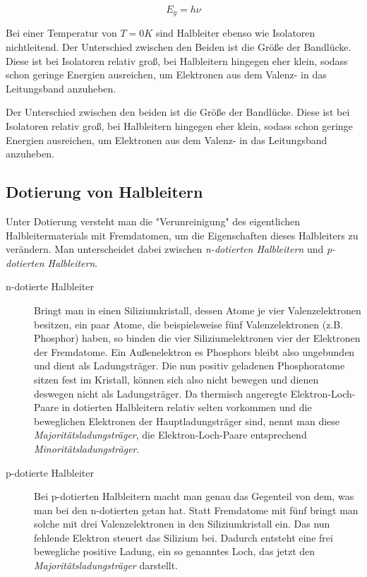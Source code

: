 \documentclass[slug=SZ, room=Hermann-Krone-Bau\,\ Labor\ 1.25, supervisor=Martin\ Kroll]{../../Lab_Report_LaTeX/lab_report}
\begin{document}
\begin{equation}\label{eq:bandenenergie}
        E_g = h\nu
\end{equation}

Bei einer Temperatur von \(T=0 K\) sind Halbleiter ebenso wie Isolatoren nichtleitend.
Der Unterschied zwischen den Beiden ist die Größe der Bandlücke. Diese ist bei Isolatoren relativ groß,
bei Halbleitern hingegen eher klein, sodass schon geringe Energien ausreichen, um Elektronen aus dem Valenz-
in das Leitungsband anzuheben.

Der Unterschied zwischen den beiden ist die Größe der Bandlücke. Diese ist bei Isolatoren relativ groß,
bei Halbleitern hingegen eher klein, sodass schon geringe Energien ausreichen, um Elektronen aus dem Valenz-
in das Leitungsband anzuheben.

\subsection{Dotierung von Halbleitern}
\label{sec:dotierung}

Unter Dotierung versteht man die "Verunreinigung" des eigentlichen Halbleitermaterials mit Fremdatomen, um
die Eigenschaften dieses Halbleiters zu verändern.
Man unterscheidet dabei zwischen \emph{n-dotierten Halbleitern} und \emph{p-dotierten Halbleitern}.

\begin{description}

        \item[n-dotierte Halbleiter]
        Bringt man in einen Siliziumkristall, dessen Atome je vier Valenzelektronen
        besitzen, ein paar Atome, die beispielsweise fünf Valenzelektronen (z.B. Phosphor) haben, so binden die
        vier Siliziumelektronen vier der Elektronen der Fremdatome. Ein Außenelektron es Phosphors bleibt also
        ungebunden und dient als Ladungsträger. Die nun positiv geladenen Phosphoratome sitzen fest im Kristall,
        können sich also nicht bewegen und dienen deswegen nicht als Ladungsträger.
        Da thermisch angeregte Elektron-Loch-Paare in dotierten Halbleitern relativ selten vorkommen und die
        beweglichen Elektronen der Hauptladungsträger sind, nennt man diese \emph{Majoritätsladungsträger}, die
        Elektron-Loch-Paare entsprechend \emph{Minoritätsladungsträger}.

        \item[p-dotierte Halbleiter]
        Bei p-dotierten Halbleitern macht man genau das Gegenteil von dem, was man
        bei den n-dotierten getan hat. Statt Fremdatome mit fünf bringt man solche mit drei Valenzelektronen
        in den Siliziumkristall ein. Das nun fehlende Elektron steuert das Silizium bei. Dadurch entsteht eine
        frei bewegliche positive Ladung, ein so genanntes Loch, das jetzt den \emph{Majoritätsladungsträger}
        darstellt.

\end{description}
\end{document}
